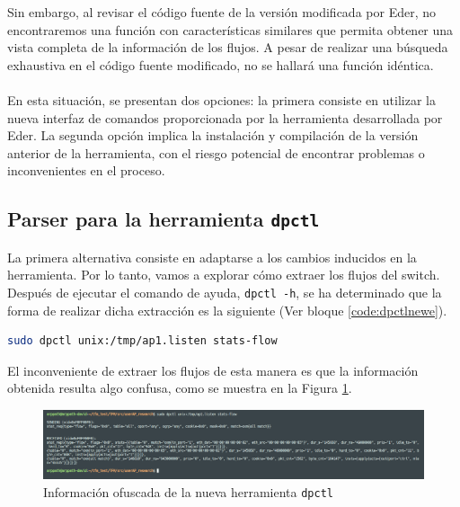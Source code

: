 
Sin embargo, al revisar el código fuente de la versión modificada por Eder, no encontraremos una función con características similares que permita obtener una vista completa de la información de los flujos. A pesar de realizar una búsqueda exhaustiva en el código fuente modificado, no se hallará una función idéntica.\\
\\
En esta situación, se presentan dos opciones: la primera consiste en utilizar la nueva interfaz de comandos proporcionada por la herramienta desarrollada por Eder. La segunda opción implica la instalación y compilación de la versión anterior de la herramienta, con el riesgo potencial de encontrar problemas o inconvenientes en el proceso.

\subsection{Parser para la herramienta \texttt{dpctl}}

La primera alternativa consiste en adaptarse a los cambios inducidos en la herramienta. Por lo tanto, vamos a explorar cómo extraer los flujos del switch. Después de ejecutar el comando de ayuda, \texttt{dpctl -h}, se ha determinado que la forma de realizar dicha extracción es la siguiente (Ver bloque \ref{code:dpctlnewe}).

\begin{lstlisting}[language= bash, style=Consola, caption={Extracción de flujos con la nueva versión de dpctl},label=code:dpctlnewe]
    sudo dpctl unix:/tmp/ap1.listen stats-flow
\end{lstlisting}
\vspace{0.5cm}

El inconveniente de extraer los flujos de esta manera es que la información obtenida resulta algo confusa, como se muestra en la Figura \ref{fig:dpctl_3}.

\begin{figure}[ht]
    \centering
    \includegraphics[width=\textwidth]{archivos/img/dev/dpctl_3.png}
    \caption{Información ofuscada de la nueva herramienta \texttt{dpctl}}
    \label{fig:dpctl_3}
\end{figure}

